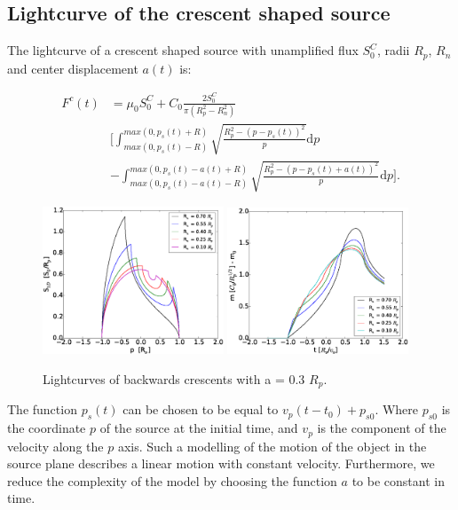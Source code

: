 \documentclass[usenatbib]{mn2e}
\begin{document}
\subsection{Lightcurve of the crescent shaped source}

The lightcurve of a crescent shaped source with unamplified flux $S_0^C$, radii $R_p$, $R_n$ and center displacement $a(t)$ is:


\begin{equation}
\begin{aligned}
 F^c(t) &= \mu_0 S_0^C + C_0 \frac{2 S_0^C}{\pi \left( R_p^2 -R_n^2 \right) } \\
    &\bigg[ \int_{max(0, p_s(t) - R)}^{max(0, p_s(t) + R)} \sqrt{\frac{R_p^2 - \left( p-p_s(t) \right)^2 }{p}} \mathrm{d}p \\
    &  -  \int_{max(0, p_s(t) - a(t) - R)}^{max(0, p_s(t) -a(t) + R)} \sqrt{\frac{R_p^2 - \left( p-p_s(t) +a(t) \right)^2 }{p}} \mathrm{d}p  \bigg] .
\end{aligned}
\end{equation}


\begin{figure}
\centering
    \includegraphics[width = 0.48\textwidth]{figures/S1D_var_rn_a_poz.eps}
    \includegraphics[width = 0.48\textwidth]{figures/5Rn_back_var_magnification.eps}
\caption{\label{fig:lightcurve_crescent_back} Lightcurves of backwards crescents with  a = 0.3 $R_p$.}
\end{figure}

The function $p_s(t)$ can be chosen to be equal to $v_p(t-t_0) + p_{s0}$. Where $p_{s0}$ is the coordinate $p$ of the source at the initial time, and $v_p$ is the component of the velocity
along the $p$ axis. Such a modelling of the motion of the object in the source plane describes a linear motion with constant velocity. Furthermore, we reduce the complexity of the model by 
choosing the function $a$ to be constant in time.  
\end{document}
